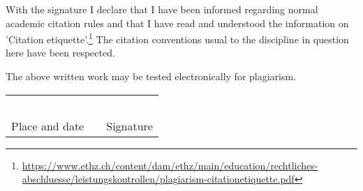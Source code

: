 With the signature I declare that I have been informed regarding normal academic citation rules and that I have read and understood the information on 'Citation etiquette'.\footnote{\url{https://www.ethz.ch/content/dam/ethz/main/education/rechtliches-abschluesse/leistungskontrollen/plagiarism-citationetiquette.pdf}} The citation conventions usual to the discipline in question here have been respected.

\vspace{0.5cm}

The above written work may be tested electronically for plagiarism.

\vspace{2cm}

\begin{tabular}{ p{5cm} p{1cm} p{5cm} }
  \cline{3-3}\\ %
  \cline{3-3}\\
  \cline{3-3}\\
  \cline{3-3}\\
  \cline{3-3}\\
  \cline{3-3}\\
  \cline{1-1} \cline{3-3}
  Place and date & & Signature \\
\end{tabular}
